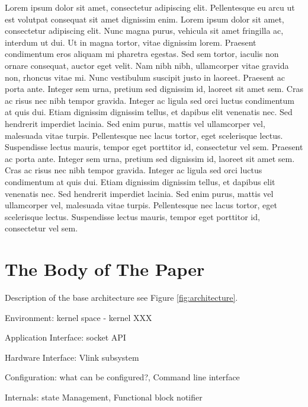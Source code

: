 \documentclass{sig-alternate}
\begin{document}
 Lorem ipsum dolor sit amet, consectetur adipiscing elit. Pellentesque eu arcu ut est volutpat consequat sit amet dignissim enim. Lorem ipsum dolor sit amet, consectetur adipiscing elit. Nunc magna purus, vehicula sit amet fringilla ac, interdum ut dui. Ut in magna tortor, vitae dignissim lorem. Praesent condimentum eros aliquam mi pharetra egestas. Sed sem tortor, iaculis non ornare consequat, auctor eget velit. Nam nibh nibh, ullamcorper vitae gravida non, rhoncus vitae mi. Nunc vestibulum suscipit justo in laoreet. Praesent ac porta ante. Integer sem urna, pretium sed dignissim id, laoreet sit amet sem. Cras ac risus nec nibh tempor gravida. Integer ac ligula sed orci luctus condimentum at quis dui. Etiam dignissim dignissim tellus, et dapibus elit venenatis nec. Sed hendrerit imperdiet lacinia. Sed enim purus, mattis vel ullamcorper vel, malesuada vitae turpis. Pellentesque nec lacus tortor, eget scelerisque lectus. Suspendisse lectus mauris, tempor eget porttitor id, consectetur vel sem. 
Praesent ac porta ante. Integer sem urna, pretium sed dignissim id, laoreet sit amet sem. Cras ac risus nec nibh tempor gravida. Integer ac ligula sed orci luctus condimentum at quis dui. Etiam dignissim dignissim tellus, et dapibus elit venenatis nec. Sed hendrerit imperdiet lacinia. Sed enim purus, mattis vel ullamcorper vel, malesuada vitae turpis. Pellentesque nec lacus tortor, eget scelerisque lectus. Suspendisse lectus mauris, tempor eget porttitor id, consectetur vel sem. 


\section{The Body of The Paper}

Description of the base architecture see Figure \ref{fig:architecture}.
\begin{compactitem}
\item Environment: kernel space - kernel XXX
\item Application Interface: socket API 
\item Hardware Interface: Vlink subsystem
\item Configuration: what can be configured?, Command line interface 
\item Internals: state Management, Functional block notifier 
\end{compactitem}
\end{document}
